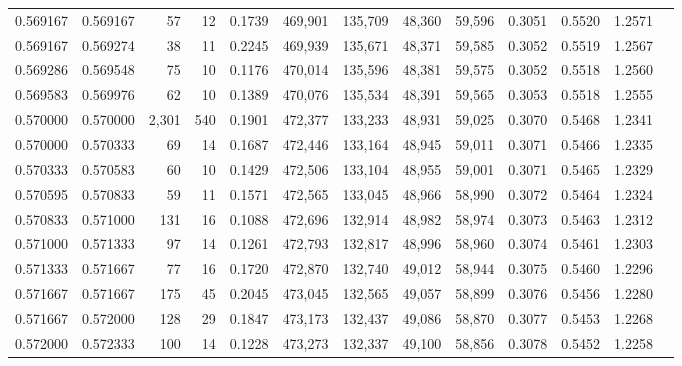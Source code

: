 \begin{tabular}{rrrrrrrrrrrrr}
0.569167 & 0.569167 &    57 &  12 &                                     0.1739 & 469,901 & 135,709 &  48,360 &  59,596 & 0.3051 & 0.5520 & 1.2571 \\
0.569167 & 0.569274 &    38 &  11 &                                     0.2245 & 469,939 & 135,671 &  48,371 &  59,585 & 0.3052 & 0.5519 & 1.2567 \\
0.569286 & 0.569548 &    75 &  10 &                                     0.1176 & 470,014 & 135,596 &  48,381 &  59,575 & 0.3052 & 0.5518 & 1.2560 \\
0.569583 & 0.569976 &    62 &  10 &                                     0.1389 & 470,076 & 135,534 &  48,391 &  59,565 & 0.3053 & 0.5518 & 1.2555 \\
0.570000 & 0.570000 & 2,301 & 540 &                                     0.1901 & 472,377 & 133,233 &  48,931 &  59,025 & 0.3070 & 0.5468 & 1.2341 \\
0.570000 & 0.570333 &    69 &  14 &                                     0.1687 & 472,446 & 133,164 &  48,945 &  59,011 & 0.3071 & 0.5466 & 1.2335 \\
0.570333 & 0.570583 &    60 &  10 &                                     0.1429 & 472,506 & 133,104 &  48,955 &  59,001 & 0.3071 & 0.5465 & 1.2329 \\
0.570595 & 0.570833 &    59 &  11 &                                     0.1571 & 472,565 & 133,045 &  48,966 &  58,990 & 0.3072 & 0.5464 & 1.2324 \\
0.570833 & 0.571000 &   131 &  16 &                                     0.1088 & 472,696 & 132,914 &  48,982 &  58,974 & 0.3073 & 0.5463 & 1.2312 \\
0.571000 & 0.571333 &    97 &  14 &                                     0.1261 & 472,793 & 132,817 &  48,996 &  58,960 & 0.3074 & 0.5461 & 1.2303 \\
0.571333 & 0.571667 &    77 &  16 &                                     0.1720 & 472,870 & 132,740 &  49,012 &  58,944 & 0.3075 & 0.5460 & 1.2296 \\
0.571667 & 0.571667 &   175 &  45 &                                     0.2045 & 473,045 & 132,565 &  49,057 &  58,899 & 0.3076 & 0.5456 & 1.2280 \\
0.571667 & 0.572000 &   128 &  29 &                                     0.1847 & 473,173 & 132,437 &  49,086 &  58,870 & 0.3077 & 0.5453 & 1.2268 \\
0.572000 & 0.572333 &   100 &  14 &                                     0.1228 & 473,273 & 132,337 &  49,100 &  58,856 & 0.3078 & 0.5452 & 1.2258 \\

\end{tabular}
